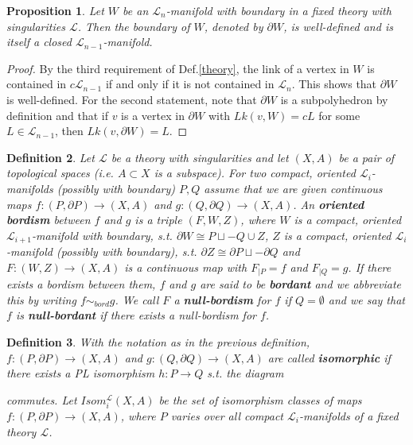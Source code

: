 \documentclass{scrreprt}
\newtheorem{prop}{Proposition}[chapter]
\newtheorem{definition}[prop]{Definition}
\begin{document}
\begin{prop}
Let $W$ be an $\mathcal{L}_n$-manifold with boundary in a fixed theory with singularities $\mathcal{L}$. Then the boundary of $W$, denoted by $\partial W$, is well-defined and is itself a closed $\mathcal{L}_{n-1}$-manifold.
\end{prop}

\begin{proof}
By the third requirement of Def.\ref{theory}, the link of a vertex in $W$ is contained in $c \mathcal{L}_{n-1}$ if and only if it is not contained in $\mathcal{L}_n$. This shows that $\partial W$ is well-defined. For the second statement, note that $\partial W$ is a subpolyhedron by definition and that if $v$ is a vertex in $\partial W$ with $Lk(v,W)=cL$ for some $L \in \mathcal{L}_{n-1}$, then $Lk(v,\partial W) = L$.
\end{proof}

\begin{definition}\label{bordismusdef}
Let $\mathcal{L}$ be a theory with singularities and let $(X,A)$ be a pair of topological spaces (i.e. $A \subset X$ is a subspace). For two compact, oriented $\mathcal{L}_i$-manifolds (possibly with boundary) $P,Q$  assume that we are given continuous maps $f:(P, \partial P) \to (X,A)$ and $g:(Q , \partial Q) \to (X,A)$. An \textbf{oriented bordism} between $f$ and $g$ is a triple $(F,W,Z)$, where $W$ is a compact, oriented $\mathcal{L}_{i+1}$-manifold with boundary, s.t. $\partial W \cong P \sqcup -Q \cup Z$, $Z$ is a compact, oriented $\mathcal{L}_i$-manifold (possibly with boundary), s.t. $\partial Z\cong \partial P \sqcup - \partial Q$ and $F: (W,Z) \to (X,A)$ is a continuous map with $F _{|P} = f$ and $F_{|Q}=g$. If there exists a bordism between them, $f$ and $g$ are said to be \textbf{bordant} and we abbreviate this by writing $f \sim_{bord} g$. We call $F$ a \textbf{null-bordism} for $f$ if $Q= \emptyset$ and we say that $f$ is \textbf{null-bordant} if there exists a null-bordism for $f$.
\end{definition}

\begin{definition}\label{isomorphiedef}
With the notation as in the previous definition, $f: (P, \partial P) \to (X,A)$ and $g: (Q, \partial Q) \to (X,A)$ are called \textbf{isomorphic} if there exists a PL isomorphism $h : P \to Q$ s.t. the diagram \newline
\begin{xy}
\end{xy}
\newline
commutes. Let $Isom_{i}^{\mathcal{L}}(X,A)$ be the set of isomorphism classes of maps $f: (P, \partial P) \to (X,A)$, where $P$ varies over all compact $\mathcal{L}_i$-manifolds of a fixed theory $\mathcal{L}$.
\end{definition}
\end{document}
